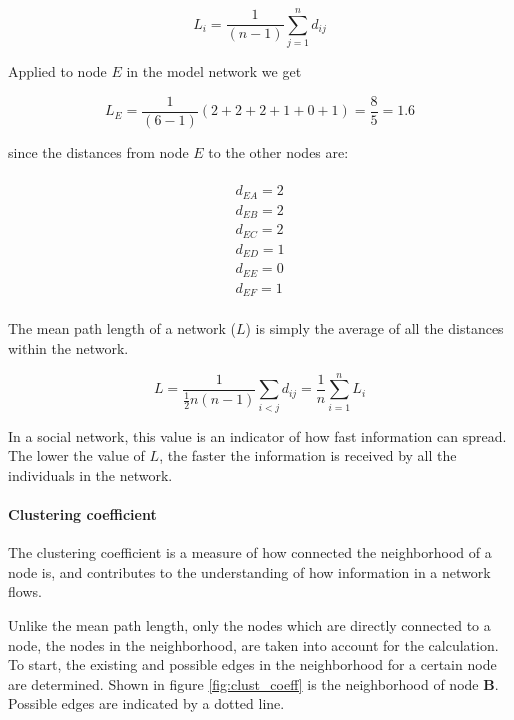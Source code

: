 \begin{equation}
L_i = \frac{1}{(n-1)}\sum^n_{j=1} d_{ij}
\label{eq:average_path_lenght}
\end{equation}

Applied to node $E$ in the model network we get

\begin{equation}
L_E = \frac{1}{(6-1)}(2 + 2 + 2 + 1 + 0 + 1) = \frac{8}{5} = 1.6
\label{eq:average_path_lenght_e}
\end{equation}

since the distances from node $E$ to the other nodes are:

\begin{multline} 
\\d_{EA} = 2 \\
d_{EB} = 2 \\
d_{EC} = 2 \\
d_{ED} = 1 \\
d_{EE} = 0 \\
d_{EF} = 1 \\
\label{eq:distances_e}
\end{multline}

The mean path length of a network ($L$) is simply the average of all the distances within the network.

\begin{equation}
L = \frac{1}{ \frac{1}{2}n(n-1)}\sum_{i<j} d_{ij} = \frac{1}{n}\sum^n_{i=1}L_i
\label{eq:mean_path_lenght}
\end{equation} 

In a social network, this value is an indicator of how fast information can spread. The lower the value of $L$, the faster the information is received by all the individuals in the network. 

\paragraph{Clustering coefficient}

The clustering coefficient\cite{watts:98} is a measure of how connected the neighborhood of a node is, and contributes to the understanding of how information in a network flows.

Unlike the mean path length, only the nodes which are directly connected to a node, the nodes in the neighborhood, are taken into account for the calculation. To start, the existing and possible edges in the neighborhood for a certain node are determined. Shown in figure \ref{fig:clust_coeff} is the neighborhood of node \textbf{B}. Possible edges are indicated by a dotted line.

